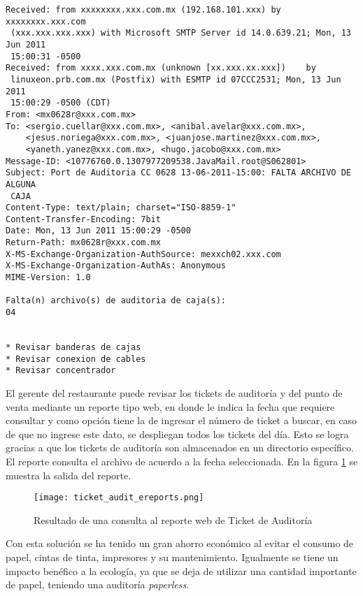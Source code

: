\begin{Verbatim}[fontsize=\tiny]
Received: from xxxxxxxx.xxx.com.mx (192.168.101.xxx) by xxxxxxxx.xxx.com
 (xxx.xxx.xxx.xxx) with Microsoft SMTP Server id 14.0.639.21; Mon, 13 Jun 2011
 15:00:31 -0500
Received: from xxxx.xxx.com.mx (unknown [xx.xxx.xx.xxx])	by
 linuxeon.prb.com.mx (Postfix) with ESMTP id 07CCC2531;	Mon, 13 Jun 2011
 15:00:29 -0500 (CDT)
From: <mx0628r@xxx.com.mx>
To: <sergio.cuellar@xxx.com.mx>, <anibal.avelar@xxx.com.mx>,
	<jesus.noriega@xxx.com.mx>, <juanjose.martinez@xxx.com.mx>,
	<yaneth.yanez@xxx.com.mx>, <hugo.jacobo@xxx.com.mx>
Message-ID: <10776760.0.1307977209538.JavaMail.root@S062801>
Subject: Port de Auditoria CC 0628 13-06-2011-15:00: FALTA ARCHIVO DE ALGUNA
 CAJA
Content-Type: text/plain; charset="ISO-8859-1"
Content-Transfer-Encoding: 7bit
Date: Mon, 13 Jun 2011 15:00:29 -0500
Return-Path: mx0628r@xxx.com.mx
X-MS-Exchange-Organization-AuthSource: mexxch02.xxx.com
X-MS-Exchange-Organization-AuthAs: Anonymous
MIME-Version: 1.0

Falta(n) archivo(s) de auditoria de caja(s):
04


* Revisar banderas de cajas
* Revisar conexion de cables
* Revisar concentrador
\end{Verbatim}

El gerente del restaurante puede revisar los tickets de auditoría y del punto de venta mediante un reporte tipo web, en donde le indica la fecha que requiere consultar y como opción tiene la de ingresar el número de ticket a buscar, en caso de que no ingrese este dato, se despliegan todos los tickets del día. Esto se logra gracias a que los tickets de auditoría son almacenados en un directorio específico. El reporte consulta el archivo de acuerdo a la fecha seleccionada. En la figura \ref{fig:rep_audit_ereports} se muestra la salida del reporte.

\begin{figure}[htb]
 \begin{center}
  \texttt{[image: ticket\_audit\_ereports.png]}
 \end{center}
 \caption{Resultado de una consulta al reporte web de Ticket de Auditoría}
 \label{fig:rep_audit_ereports}
\end{figure}

Con esta solución se ha tenido un gran ahorro económico al evitar el consumo de papel, cintas de tinta, impresores y su mantenimiento. Igualmente se tiene un impacto benéfico a la ecología, ya que se deja de utilizar una cantidad importante de papel, teniendo una auditoría \textit{paperless}.

